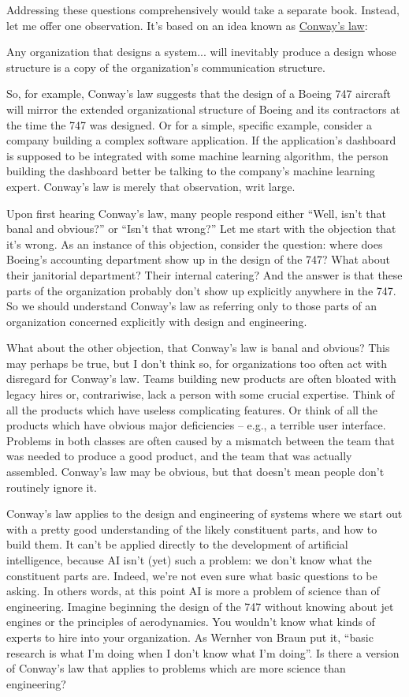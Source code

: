 \documentclass[a4paper,twoside,10pt]{book}
\begin{document}
Addressing these questions comprehensively would take a separate book. Instead, let me offer one observation. It's based on an idea known as \href{http://en.wikipedia.org/wiki/Conway\%27s_law}{Conway's law}:
\begin{adjustwidth}{1.5cm}{1cm}
Any organization that designs a system... will inevitably produce a design whose structure is a copy of the organization's communication structure.
\end{adjustwidth}
So, for example, Conway's law suggests that the design of a Boeing 747 aircraft will mirror the extended organizational structure of Boeing and its contractors at the time the 747 was designed. Or for a simple, specific example, consider a company building a complex software application. If the application's dashboard is supposed to be integrated with some machine learning algorithm, the person building the dashboard better be talking to the company's machine learning expert. Conway's law is merely that observation, writ large.

Upon first hearing Conway's law, many people respond either ``Well, isn't that banal and obvious?'' or ``Isn't that wrong?'' Let me start with the objection that it's wrong. As an instance of this objection, consider the question: where does Boeing's accounting department show up in the design of the 747? What about their janitorial department? Their internal catering? And the answer is that these parts of the organization probably don't show up explicitly anywhere in the 747. So we should understand Conway's law as referring only to those parts of an organization concerned explicitly with design and engineering.

What about the other objection, that Conway's law is banal and obvious? This may perhaps be true, but I don't think so, for organizations too often act with disregard for Conway's law. Teams building new products are often bloated with legacy hires or, contrariwise, lack a person with some crucial expertise. Think of all the products which have useless complicating features. Or think of all the products which have obvious major deficiencies -- e.g., a terrible user interface. Problems in both classes are often caused by a mismatch between the team that was needed to produce a good product, and the team that was actually assembled. Conway's law may be obvious, but that doesn't mean people don't routinely ignore it.

Conway's law applies to the design and engineering of systems where we start out with a pretty good understanding of the likely constituent parts, and how to build them. It can't be applied directly to the development of artificial intelligence, because AI isn't (yet) such a problem: we don't know what the constituent parts are. Indeed, we're not even sure what basic questions to be asking. In others words, at this point AI is more a problem of science than of engineering. Imagine beginning the design of the 747 without knowing about jet engines or the principles of aerodynamics. You wouldn't know what kinds of experts to hire into your organization. As Wernher von Braun put it, ``basic research is what I'm doing when I don't know what I'm doing''. Is there a version of Conway's law that applies to problems which are more science than engineering?
\end{document}
